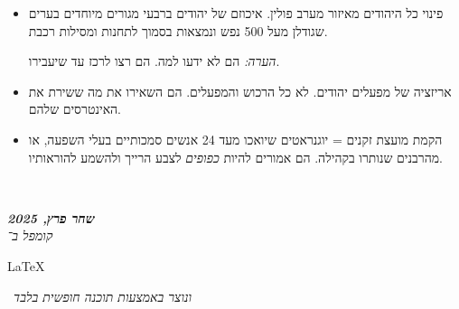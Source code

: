 \documentclass[]{article}
\newcommand\en[1] {\begin{otherlanguage}{english}#1\end{otherlanguage}}
\newcommand\ndoc  {\dotfill \\ \vfil {\begin{center}
            {\textbf{\textit{שחר פרץ, 2025}} \\
                \scriptsize \textit{קומפל ב־}\en{\LaTeX}\,\textit{ ונוצר באמצעות תוכנה חופשית בלבד}}
    \end{center}} \vfil	}
\theoremstyle{definition}
\begin{document}
    \begin{itemize}
        \item פינוי כל היהודים מאיזור מערב פולין. איכוזם של יהודים ברבעי מגורים מיוחדים בערים שגודלן מעל 500 נפש ונמצאות בסמוך לתחנות ומסילות רכבת. 
        
        \textit{הערה: }הם לא ידעו למה. הם רצו לרכז עד שיעבירו. 
        \item אריזציה של מפעלים יהודים. לא כל הרכוש והמפעלים. הם השאירו את מה ששירת את האינטרסים שלהם. 
        \item הקמת מועצת זקנים = יוגנראטים שיואכו מעד 24 אנשים סמכותיים בעלי השפעה, או מהרבנים שנותרו בקהילה. הם אמורים להיות \textit{כפופים} לצבע הרייך ולהשמע להוראותיו. 
    \end{itemize}
    
    
    
    \ndoc
\end{document}
